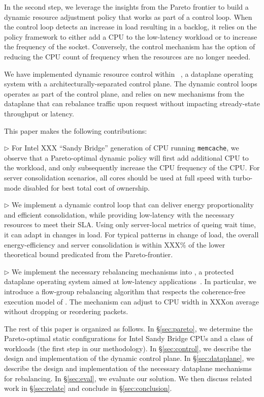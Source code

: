 In the second step, we leverage the insights from the Pareto frontier
to build a dynamic resource adjustment policy that works as part of a
control loop.  When the control loop detects an increase in load
resulting in a backlog, it relies on the policy framework to either
add a CPU to the low-latency workload or to increase the frequency of
the socket.  Conversely, the control mechanism has the option of
reducing the CPU count of frequency when the resources are no longer
needed.

We have implemented dynamic resource control within \ix~\cite{ix-osdi}, a dataplane
operating system with a architecturally-separated control plane.  The
dynamic control loops operates as part of the control plane, and
relies on new mechanisms from the \ix dataplane that can rebalance
traffic upon request without impacting stready-state throughput or
latency.


This paper makes the following contributions:

$\triangleright$ For Intel XXX ``Sandy Bridge'' generation of CPU
running \texttt{memcache}, we observe that a Pareto-optimal dynamic
policy will first add additional CPU to the workload, and only
subsequently increase the CPU frequency of the CPU.  For server
consolidation scenarios, all cores should be used at full speed with
turbo-mode disabled for best total cost of ownership.

$\triangleright$ We implement a dynamic control loop that can deliver
energy proportionality and efficient consolidation, while providing
low-latency with the necessary resources to meet their SLA.  Using
only server-local metrics of queing wait time, it can adapt in changes
in load.  For typical patterns in change of load, the overall
energy-efficiency and server consolidation is within XXX\% of the
lower theoretical bound predicated from the Pareto-frontier.

$\triangleright$ We implement the necessary rebalancing mechanisms
into \ix, a protected dataplane operating system aimed at low-latency
applications~\cite{ix-osdi}.  In particular, we introduce a flow-group
rebalancing algorithm that respects the coherence-free execution model
of \ix.  The mechanism can adjust to CPU width in XXX\microsecond on
average without dropping or reordering packets.

The rest of this paper is organized as follows. 
In \S\ref{sec:pareto}, we determine the Pareto-optimal static configurations for Intel
Sandy Bridge CPUs and a class of workloads (the first step in our
methodology).  In \S\ref{sec:control}, we describe the design and
implementation of the dynamic control plane.  In
\S\ref{sec:dataplane}, we describe the design and implementation of
the necessary dataplane mechanisms for rebalancing.  In
\S\ref{sec:eval}, we evaluate our solution.  We then discuss related
work in \S\ref{sec:relate} and conclude in \S\ref{sec:conclusion}.




